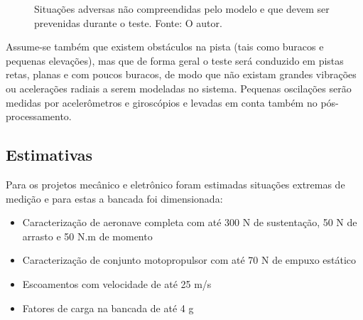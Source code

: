 \begin{figure}[!ht]
    \centering
    \caption{Situações adversas não compreendidas pelo modelo e que devem ser prevenidas durante o teste. Fonte: O autor.}
        \label{forca_radial_frontal}
        \qquad
        \label{momento_falso_roll}
\end{figure}

Assume-se também que existem obstáculos na pista (tais como buracos e pequenas elevações), mas que de forma geral o teste será conduzido em pistas retas, planas e com poucos buracos, de modo que não existam grandes vibrações ou acelerações radiais a serem modeladas no sistema. Pequenas oscilações serão medidas por acelerômetros e giroscópios e levadas em conta também no pós-processamento.

\subsection{Estimativas}

Para os projetos mecânico e eletrônico foram estimadas situações extremas de medição e para estas a bancada foi dimensionada:

\begin{itemize}
    \item Caracterização de aeronave completa com até 300 N de sustentação, 50 N de arrasto e 50 N.m de momento
    \item Caracterização de conjunto motopropulsor com até 70 N de empuxo estático
    \item Escoamentos com velocidade de até 25 m/s
    \item Fatores de carga na bancada de até 4 g
\end{itemize}

